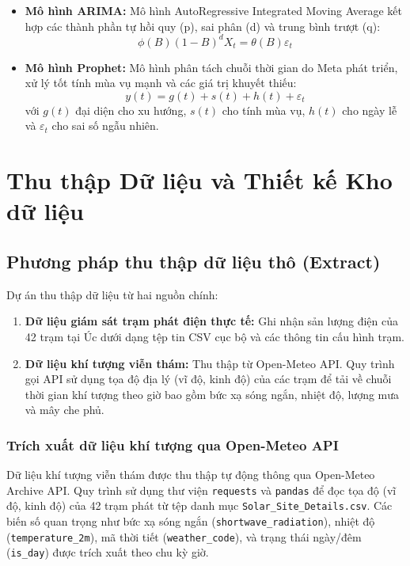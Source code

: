 \documentclass[12pt, a4paper]{report}
\begin{document}
\begin{itemize}[noitemsep]
    \item \textbf{Mô hình ARIMA:} Mô hình AutoRegressive Integrated Moving Average kết hợp các thành phần tự hồi quy (p), sai phân (d) và trung bình trượt (q):
    \begin{equation}
        \phi(B)(1-B)^d X_t = \theta(B) \varepsilon_t
    \end{equation}
    \item \textbf{Mô hình Prophet:} Mô hình phân tách chuỗi thời gian do Meta phát triển, xử lý tốt tính mùa vụ mạnh và các giá trị khuyết thiếu:
    \begin{equation}
        y(t) = g(t) + s(t) + h(t) + \varepsilon_t
    \end{equation}
    với $g(t)$ đại diện cho xu hướng, $s(t)$ cho tính mùa vụ, $h(t)$ cho ngày lễ và $\varepsilon_t$ cho sai số ngẫu nhiên.
\end{itemize}


\chapter{Thu thập Dữ liệu và Thiết kế Kho dữ liệu}
\label{chap:thuthap_kho}

\section{Phương pháp thu thập dữ liệu thô (Extract)}
\label{sec:datannguon}

Dự án thu thập dữ liệu từ hai nguồn chính:
\begin{enumerate}[noitemsep]
    \item \textbf{Dữ liệu giám sát trạm phát điện thực tế:} Ghi nhận sản lượng điện của 42 trạm tại Úc dưới dạng tệp tin CSV cục bộ và các thông tin cấu hình trạm.
    \item \textbf{Dữ liệu khí tượng viễn thám:} Thu thập từ Open-Meteo API. Quy trình gọi API sử dụng tọa độ địa lý (vĩ độ, kinh độ) của các trạm để tải về chuỗi thời gian khí tượng theo giờ bao gồm bức xạ sóng ngắn, nhiệt độ, lượng mưa và mây che phủ.
\end{enumerate}

\subsection{Trích xuất dữ liệu khí tượng qua Open-Meteo API}
Dữ liệu khí tượng viễn thám được thu thập tự động thông qua Open-Meteo Archive API. Quy trình sử dụng thư viện \texttt{requests} và \texttt{pandas} để đọc tọa độ (vĩ độ, kinh độ) của 42 trạm phát từ tệp danh mục \texttt{Solar\_Site\_Details.csv}. Các biến số quan trọng như bức xạ sóng ngắn (\texttt{shortwave\_radiation}), nhiệt độ (\texttt{temperature\_2m}), mã thời tiết (\texttt{weather\_code}), và trạng thái ngày/đêm (\texttt{is\_day}) được trích xuất theo chu kỳ giờ.
\end{document}
